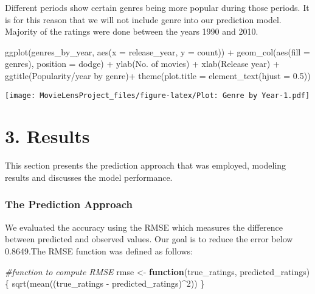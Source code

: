 \documentclass[
]{article}
\newenvironment{Shaded}{\begin{snugshade}}{\end{snugshade}}
\newcommand{\AttributeTok}[1]{\textcolor[rgb]{0.77,0.63,0.00}{#1}}
\newcommand{\CommentTok}[1]{\textcolor[rgb]{0.56,0.35,0.01}{\textit{#1}}}
\newcommand{\ControlFlowTok}[1]{\textcolor[rgb]{0.13,0.29,0.53}{\textbf{#1}}}
\newcommand{\DecValTok}[1]{\textcolor[rgb]{0.00,0.00,0.81}{#1}}
\newcommand{\FloatTok}[1]{\textcolor[rgb]{0.00,0.00,0.81}{#1}}
\newcommand{\FunctionTok}[1]{\textcolor[rgb]{0.00,0.00,0.00}{#1}}
\newcommand{\NormalTok}[1]{#1}
\newcommand{\OtherTok}[1]{\textcolor[rgb]{0.56,0.35,0.01}{#1}}
\newcommand{\SpecialCharTok}[1]{\textcolor[rgb]{0.00,0.00,0.00}{#1}}
\newcommand{\StringTok}[1]{\textcolor[rgb]{0.31,0.60,0.02}{#1}}
\begin{document}
Different periods show certain genres being more popular during those
periods. It is for this reason that we will not include genre into our
prediction model. Majority of the ratings were done between the years
1990 and 2010.

\begin{Shaded}
\begin{Highlighting}[]
\FunctionTok{ggplot}\NormalTok{(genres\_by\_year, }\FunctionTok{aes}\NormalTok{(}\AttributeTok{x =}\NormalTok{ release\_year, }\AttributeTok{y =}\NormalTok{ count)) }\SpecialCharTok{+} 
  \FunctionTok{geom\_col}\NormalTok{(}\FunctionTok{aes}\NormalTok{(}\AttributeTok{fill =}\NormalTok{ genres), }\AttributeTok{position =} \StringTok{\textquotesingle{}dodge\textquotesingle{}}\NormalTok{) }\SpecialCharTok{+} 
  \FunctionTok{ylab}\NormalTok{(}\StringTok{\textquotesingle{}No. of movies\textquotesingle{}}\NormalTok{) }\SpecialCharTok{+} 
  \FunctionTok{xlab}\NormalTok{(}\StringTok{\textquotesingle{}Release year\textquotesingle{}}\NormalTok{) }\SpecialCharTok{+} 
  \FunctionTok{ggtitle}\NormalTok{(}\StringTok{\textquotesingle{}Popularity/year by genre\textquotesingle{}}\NormalTok{)}\SpecialCharTok{+}
  \FunctionTok{theme}\NormalTok{(}\AttributeTok{plot.title =} \FunctionTok{element\_text}\NormalTok{(}\AttributeTok{hjust =} \FloatTok{0.5}\NormalTok{))}
\end{Highlighting}
\end{Shaded}

\texttt{[image: MovieLensProject\_files/figure-latex/Plot: Genre by Year-1.pdf]}

\hypertarget{results}{%
\section{3. Results}\label{results}}

This section presents the prediction approach that was employed,
modeling results and discusses the model performance.

\hypertarget{the-prediction-approach}{%
\subsubsection{The Prediction Approach}\label{the-prediction-approach}}

We evaluated the accuracy using the RMSE which measures the difference
between predicted and observed values. Our goal is to reduce the error
below 0.8649.The RMSE function was defined as follows:

\begin{Shaded}
\begin{Highlighting}[]
\CommentTok{\#function to compute RMSE}
\NormalTok{rmse }\OtherTok{\textless{}{-}} \ControlFlowTok{function}\NormalTok{(true\_ratings, predicted\_ratings)\{}
  \FunctionTok{sqrt}\NormalTok{(}\FunctionTok{mean}\NormalTok{((true\_ratings }\SpecialCharTok{{-}}\NormalTok{ predicted\_ratings)}\SpecialCharTok{\^{}}\DecValTok{2}\NormalTok{))}
\NormalTok{\}}
\end{Highlighting}
\end{Shaded}
\end{document}
